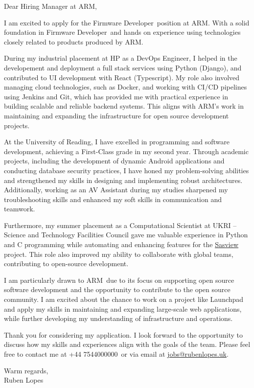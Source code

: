 \documentclass[a4paper, 12pt]{letter}
\def\phone{+44 7544000000}
\def\organisation{ARM}
\def\position{Firmware Developer}
\def\positionAd{Firmware Developer} %
\def\customA{supporting open source software development and the opportunity to contribute to the open source community}
\def\customB{on a project like Launchpad and apply my skills in maintaining and expanding large-scale web applications}
\begin{document}
\begin{letter}{}

\opening{Dear Hiring Manager at \organisation,}

I am excited to apply for the \position\ position at \organisation. With a solid foundation in \positionAd\ and hands on experience using technologies closely related to products produced by \organisation.

During my industrial placement at HP as a DevOps Engineer, I helped in the developement and deployment a full stack services using Python (Django), and contributed to UI development with React (Typescript). My role also involved managing cloud technologies, such as Docker, and working with CI/CD pipelines using Jenkins and Git, which has provided me with practical experience in building scalable and reliable backend systems. This aligns with \organisation’s work in maintaining and expanding the infrastructure for open source development projects.

At the University of Reading, I have excelled in programming and software development, achieving a First-Class grade in my second year. Through academic projects, including the development of dynamic Android applications and conducting database security practices, I have honed my problem-solving abilities and strengthened my skills in designing and implementing robust architectures. Additionally, working as an AV Assistant during my studies sharpened my troubleshooting skills and enhanced my soft skills in communication and teamwork.

Furthermore, my summer placement as a Computational Scientist at UKRI -- Science and Technology Facilities Council gave me valuable experience in Python and C programming while automating and enhancing features for the \href{https://www.sasview.org/}{Sasview} project. This role also improved my ability to collaborate with global teams, contributing to open-source development.

I am particularly drawn to \organisation\ due to its focus on \customA. I am excited about the chance to work \customB, while further developing my understanding of infrastructure and operations.

Thank you for considering my application. I look forward to the opportunity to discuss how my skills and experiences align with the goals of the team. Please feel free to contact me at \phone\ or via email at  \href{mailto:jobs@rubenlopes.uk}{jobs@rubenlopes.uk}.

\closing{Warm regards, \\ Ruben Lopes}

\end{letter}
\end{document}
